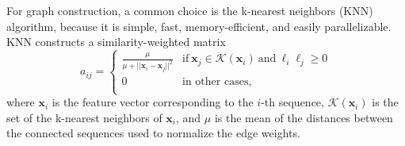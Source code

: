 \documentclass{article}
\begin{document}
For graph construction, a common choice is the k-nearest neighbors (KNN) algorithm, because it is simple, fast, memory-efficient, and easily parallelizable. KNN constructs a similarity-weighted matrix
\begin{equation}
	a_{ij} =
	\begin{cases}
		\frac{\mu}{\mu + ||\mathbf{x}_{i} - \mathbf{x}_{j}||^2} & \text{if} \ \mathbf{x}_{j} \in  \mathcal{K}(\mathbf{x}_{i}) \ \text{and} \ \ell_{i} \ell_{j} \geq 0 \\
		0 & \text{in other cases,} \\
	\end{cases}
\end{equation}
\noindent where $\mathbf{x}_{i}$ is the feature vector corresponding to the $i$-th sequence, $\mathcal{K}(\mathbf{x}_{i})$ is the set of the k-nearest neighbors of $\mathbf{x}_{i}$, and $\mu$ is the mean of the distances between the connected sequences used to normalize the edge weights.
\end{document}
